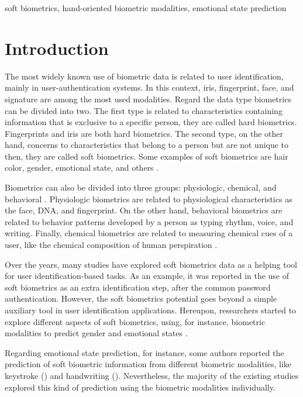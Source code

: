 \documentclass[conference]{IEEEtran}
\begin{document}
\begin{IEEEkeywords}
soft biometrics, hand-oriented biometric modalities,  emotional state prediction
\end{IEEEkeywords}

\section{Introduction}

The most widely known use of biometric data is related to user identification, mainly in user-authentication systems. In this context, iris, fingerprint, face, and signature are among the most used modalities. Regard the data type biometrics can be divided into two. The first type is related to characteristics containing information that is exclusive to a specific person, they are called hard biometrics. Fingerprints and iris are both hard biometrics. The second type, on the other hand, concerns to characteristics that belong to a person but are not unique to then, they are called soft biometrics. Some examples of soft biometrics are hair color, gender, emotional state, and others \cite{handbook-multibiometrics,marjory-emotion1}. 

Biometrics can also be divided into three groups: physiologic, chemical, and behavioral \cite{handbook-biometrics}. Physiologic biometrics are related to physiological characteristics as the face, DNA, and fingerprint. On the other hand, behavioral biometrics are related to behavior patterns developed by a person as typing rhythm, voice, and writing. Finally, chemical biometrics are related to measuring chemical cues of a user, like the chemical composition of human perspiration \cite{chemical-biometric-example}. 

Over the years, many studies have explored soft biometrics data as a helping tool for user identification-based tasks. As an example, it was reported in \cite{continuous-auth} the use of soft biometrics as an extra identification step, after the common password authentication. 
However, the soft biometrics potential goes beyond a simple auxiliary tool in user identification applications. Hereupon, researchers started to explore different aspects of soft biometrics, using, for instance, biometric modalities to predict gender \cite{hw-gender1, cheng-hw-gender} and emotional states \cite{cheng-emotional, ks-emotion1, cheng-hw-gender}. 

Regarding emotional state prediction, for instance, some authors reported the prediction of soft biometric information from different biometric modalities, like keystroke (\cite{ks-emotion1, ks-emotion2-mouse}) and handwriting (\cite{cheng-emotional}). Nevertheless, the majority of the existing studies explored this kind of prediction using the biometric modalities individually.
\end{document}

